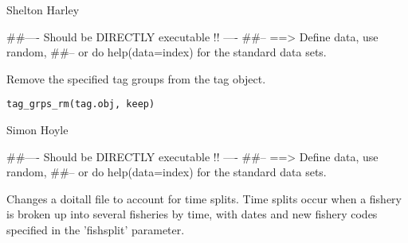 \documentclass[a4paper]{book}
\begin{document}
%
\begin{Author}\relax

Shelton Harley
\end{Author}
%
\begin{Examples}
\begin{ExampleCode}
##---- Should be DIRECTLY executable !! ----
##-- ==>  Define data, use random,
##--	or do  help(data=index)  for the standard data sets.

\end{ExampleCode}
\end{Examples}
%
\begin{Description}\relax

Remove the specified tag groups from the tag object. 
\end{Description}
%
\begin{Usage}
\begin{verbatim}
tag_grps_rm(tag.obj, keep)
\end{verbatim}
\end{Usage}
%
\begin{Arguments}
\begin{ldescription}
\item[\code{tag.obj}] 


\item[\code{keep}] 


\end{ldescription}
\end{Arguments}
%
\begin{Author}\relax

Simon Hoyle
\end{Author}
%
\begin{Examples}
\begin{ExampleCode}
##---- Should be DIRECTLY executable !! ----
##-- ==>  Define data, use random,
##--	or do  help(data=index)  for the standard data sets.

\end{ExampleCode}
\end{Examples}
%
\begin{Description}\relax

Changes a doitall file to account for time splits. 
Time splits occur when a fishery is broken up into several fisheries by time, with dates and new fishery codes specified in the 'fishsplit' parameter. 
\end{Description}
\end{document}
